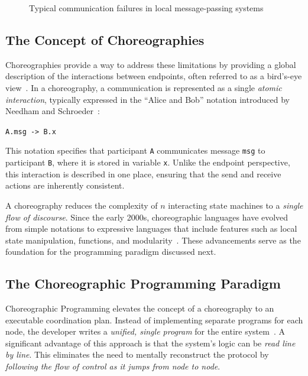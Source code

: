\begin{figure}[h]
\begin{minipage}{0.46\textwidth}
 		\caption*{(b) Deadlock: both endpoints wait for each other and neither can proceed}
 	\end{minipage}
 	\caption{Typical communication failures in local message-passing systems}
 	\label{fig:mismatches}
 \end{figure}
 


\subsection{The Concept of Choreographies}
Choreographies provide a way to address these limitations by providing a global description of the interactions between endpoints, often referred to as a bird's-eye view~\cite{Montesi2023}. In a choreography, a communication is represented as a single \textit{atomic interaction}, typically expressed in the ``Alice and Bob'' notation introduced by Needham and Schroeder~\cite{NeedhamSchroeder1978}:
\begin{center}
	\texttt{A.msg -> B.x}
\end{center}
This notation specifies that participant \texttt{A} communicates message \texttt{msg} to participant \texttt{B}, where it is stored in variable \texttt{x}. Unlike the endpoint perspective, this interaction is described in one place, ensuring that the send and receive actions are inherently consistent. 

A choreography reduces the complexity of $n$ interacting state machines to a \textit{single flow of discourse}. Since the early 2000s, choreographic languages have evolved from simple notations to expressive languages that include features such as local state manipulation, functions, and modularity~\cite{CruzFilipe2022, Montesi2023}. These advancements serve as the foundation for the programming paradigm discussed next.

\subsection{The Choreographic Programming Paradigm}
\label{subsec:choreographic_programming_paradigm}
Choreographic Programming elevates the concept of a choreography to an executable coordination plan. Instead of implementing separate programs for each node, the developer writes a \textit{unified, single program} for the entire system~\cite{AliKuper2023}. A significant advantage of this approach is that the system's logic can be \textit{read line by line}. This eliminates the need to mentally reconstruct the protocol by \textit{following the flow of control as it jumps from node to node}.

